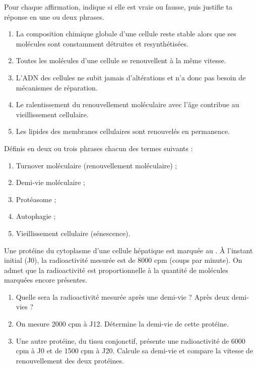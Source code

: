 \documentclass[11pt]{article}
\newcommand{\cle}[1]{{\popxbold\color{popdark}#1}}
\begin{document}
\begin{exercice}
Pour chaque affirmation, indique si elle est vraie ou fausse, puis justifie ta réponse en une ou deux phrases.
\begin{enumerate}
\item La composition chimique globale d'une cellule reste stable alors que ses molécules sont constamment détruites et resynthétisées.
\item Toutes les molécules d'une cellule se renouvellent à la même vitesse.
\item L'ADN des cellules ne subit jamais d'altérations et n'a donc pas besoin de mécanismes de réparation.
\item Le ralentissement du renouvellement moléculaire avec l'âge contribue au vieillissement cellulaire.
\item Les lipides des membranes cellulaires sont renouvelés en permanence.
\end{enumerate}
\end{exercice}

\begin{exercice}
Définis en deux ou trois phrases chacun des termes suivants :
\begin{enumerate}
\item \cle{Turnover moléculaire} (renouvellement moléculaire) ;
\item \cle{Demi-vie moléculaire} ;
\item \cle{Protéasome} ;
\item \cle{Autophagie} ;
\item \cle{Vieillissement cellulaire} (sénescence).
\end{enumerate}
\end{exercice}

\begin{exercice}
Une protéine du cytoplasme d'une cellule hépatique est marquée au . À l'instant initial (J0), la radioactivité mesurée est de \num{8000} cpm (coups par minute). On admet que la radioactivité est proportionnelle à la quantité de molécules marquées encore présentes.
\begin{enumerate}
\item Quelle sera la radioactivité mesurée après une demi-vie ? Après deux demi-vies ?
\item On mesure \num{2000} cpm à J12. Détermine la demi-vie de cette protéine.
\item Une autre protéine, du tissu conjonctif, présente une radioactivité de \num{6000} cpm à J0 et de \num{1500} cpm à J20. Calcule sa demi-vie et compare la vitesse de renouvellement des deux protéines.
\end{enumerate}
\end{exercice}
\end{document}
